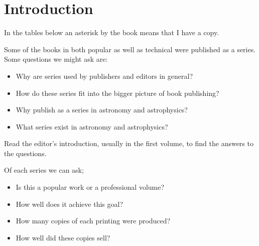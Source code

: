 \section{Introduction}

In the tables below an asterisk by the book means that I have a copy.

Some of the books in  both popular as well as technical were published
as a series. Some questions we might ask are:

\begin{itemize}
  \item Why are series used by publishers and editors in general?
  \item How do these series fit into the bigger picture of book publishing?
  \item Why publish as a series in astronomy and astrophysics?
  \item What series exist in astronomy and astrophysics?
\end{itemize}

Read the editor's introduction, usually in the first volume, to
find the answers to the questions.
  
Of each series we can ask;

\begin{itemize}
  \item Is this a popular work or a professional volume?
  \item How well does it achieve this goal?
  \item How many copies of each printing were produced?
  \item How well did these copies sell?
\end{itemize}

